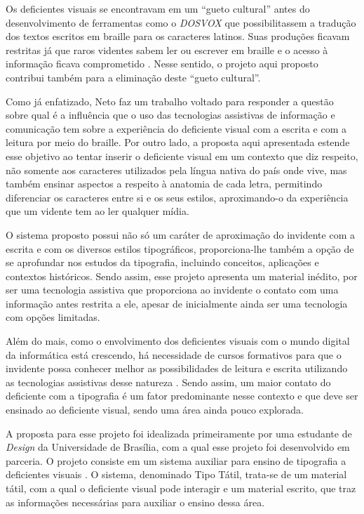 Os deficientes visuais se encontravam em um ``gueto cultural'' antes do desenvolvimento de ferramentas como o \textit{DOSVOX} que possibilitassem a tradução dos textos escritos em braille para os caracteres latinos. Suas produções ficavam restritas já que raros videntes sabem ler ou escrever em braille e o acesso à informação ficava comprometido . Nesse sentido, o projeto aqui proposto contribui também para a eliminação deste ``gueto cultural''.

Como já enfatizado, Neto  faz um trabalho voltado para responder a questão sobre qual é a influência que o uso das tecnologias assistivas de informação e comunicação tem sobre a experiência do deficiente visual com a escrita e com a leitura por meio do braille. Por outro lado, a proposta aqui apresentada estende esse objetivo ao tentar inserir o deficiente visual em um contexto que diz respeito, não somente aos caracteres utilizados pela língua nativa do país onde vive, mas também ensinar aspectos a respeito à anatomia de cada letra, permitindo diferenciar os caracteres entre si e os seus estilos, aproximando-o da experiência que um vidente tem ao ler qualquer mídia.

O sistema proposto possui não só um caráter de aproximação do invidente com a escrita e com os diversos estilos tipográficos, proporciona-lhe também a opção de se aprofundar nos estudos da tipografia, incluindo conceitos, aplicações e contextos históricos. Sendo assim, esse projeto apresenta um material inédito, por ser uma tecnologia assistiva que proporciona ao invidente o contato com uma informação antes restrita a ele, apesar de inicialmente ainda ser uma tecnologia com opções limitadas.

Além do mais, como o envolvimento dos deficientes visuais com o mundo digital da informática está crescendo, há necessidade de cursos formativos para que o invidente possa conhecer melhor as possibilidades de leitura e escrita utilizando as tecnologias assistivas desse natureza . Sendo assim, um maior contato do deficiente com a tipografia é um fator predominante nesse contexto e que deve ser ensinado ao deficiente visual, sendo uma área ainda pouco explorada.

A proposta para esse projeto foi idealizada primeiramente por uma estudante de \textit{Design} da Universidade de Brasília, com a qual esse projeto foi desenvolvido em parceria. O projeto consiste em um sistema auxiliar para ensino de tipografia a deficientes visuais . O sistema, denominado Tipo Tátil, trata-se de um material tátil, com a qual o deficiente visual pode interagir e um material escrito, que traz as informações necessárias para auxiliar o ensino dessa área.

